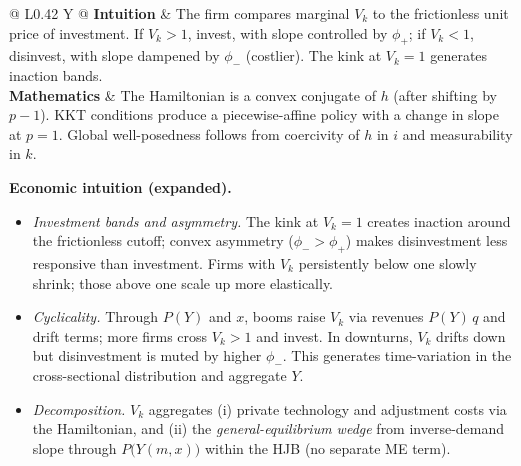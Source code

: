 \documentclass[11pt,letterpaper,oneside]{article}
\numberwithin{equation}{section}
\newcommand{\TableTighten}{\setlength{\tabcolsep}{5pt}\renewcommand{\arraystretch}{1.08}}
\newcommand{\TableTightBegin}{\begingroup\TableTighten}
\newcommand{\TableTightEnd}{\endgroup}
\newcommand{\1}{\mathbf{1}}
\begin{document}
\begin{tcolorbox}[didacticstyle]
\sloppy\footnotesize
\TableTightBegin
\begin{tabularx}{\linewidth}{@{} L{0.42\linewidth} Y @{}}
\textbf{Intuition} & The firm compares marginal $V_k$ to the frictionless unit price of investment. If $V_k>1$, invest, with slope controlled by $\phi_+$; if $V_k<1$, disinvest, with slope dampened by $\phi_-$ (costlier). The kink at $V_k=1$ generates inaction bands.\\
\textbf{Mathematics} & The Hamiltonian is a convex conjugate of $h$ (after shifting by $p-1$). KKT conditions produce a piecewise-affine policy with a change in slope at $p=1$. Global well-posedness follows from coercivity of $h$ in $i$ and measurability in $k$.
\end{tabularx}
\TableTightEnd
\end{tcolorbox}

\begin{tcolorbox}[didacticstyle]
\textbf{Economic intuition (expanded).}
\begin{itemize}[leftmargin=1.15em,itemsep=0.25em]
  \item \emph{Investment bands and asymmetry.} The kink at $V_k=1$ creates inaction around the frictionless cutoff; convex asymmetry ($\phi_->\phi_+$) makes disinvestment less responsive than investment. Firms with $V_k$ persistently below one slowly shrink; those above one scale up more elastically.
  \item \emph{Cyclicality.} Through $P(Y)$ and $x$, booms raise $V_k$ via revenues $P(Y)\,q$ and drift terms; more firms cross $V_k>1$ and invest. In downturns, $V_k$ drifts down but disinvestment is muted by higher $\phi_-$. This generates time-variation in the cross-sectional distribution and aggregate $Y$.
  \item \emph{Decomposition.} $V_k$ aggregates (i) private technology and adjustment costs via the Hamiltonian, and (ii) the \emph{general-equilibrium wedge} from inverse-demand slope through $P\big(Y(m,x)\big)$ within the HJB (no separate ME term).
\end{itemize}
\end{tcolorbox}
\end{document}
